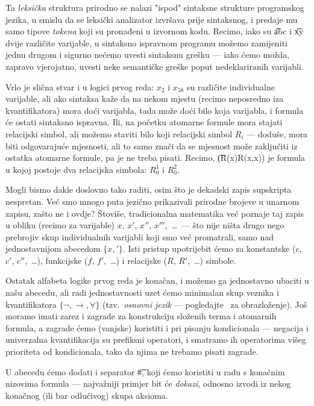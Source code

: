 Ta \emph{leksička} struktura prirodno se nalazi "ispod" sintaksne strukture programskog jezika, u smislu da se leksički analizator izvršava prije sintaksnog, i predaje mu samo tipove \emph{tokena} koji su pronađeni u izvornom kodu. Recimo, iako su \t{abc} i \t{xy} dvije različite varijable, u sintaksno ispravnom programu možemo zamijeniti jednu drugom i sigurno nećemo uvesti sintaksnu grešku --- iako ćemo možda, zapravo vjerojatno, uvesti neke semantičke greške poput nedeklariranih varijabli.

Vrlo je slična stvar i u logici prvog reda: $x_2$ i $x_{58}$ su različite individualne varijable, ali ako sintaksa kaže da na nekom mjestu (recimo neposredno iza kvantifikatora) mora doći varijabla, tada može doći bilo koja varijabla, i formula će ostati sintaksno ispravna. Ili, na početku atomarne formule mora stajati relacijski simbol, ali možemo staviti bilo koji relacijski simbol $R_i$ --- doduše, mora biti odgovarajuće mjesnosti, ali to samo znači da se mjesnost može zaključiti iz ostatka atomarne formule, pa je ne treba pisati. Recimo, \t{(R(x)\textrightarrow R(x,x))} je formula u kojoj postoje dva relacijska simbola: $R_0^1$ i $R_0^2$.

Mogli bismo dakle doslovno tako raditi, osim što je dekadski zapis supskripta nespretan. Već smo mnogo puta jezično prikazivali prirodne brojeve u unarnom zapisu, zašto ne i ovdje? Štoviše, tradicionalna matematika već poznaje taj zapis u obliku (recimo za varijable) $x$, $x'$, $x''$, $x'''$,~\ldots\ --- što nije ništa drugo nego prebrojiv skup individualnih varijabli koji smo već promatrali, samo nad jednostavnijom abecedom $\{x,'\!\}$. Isti pristup upotrijebit ćemo za konstantske ($c$, $c'$, $c''$,~\ldots), funkcijske ($f$, $f'$,~\ldots) i relacijske ($R$, $R'$,~\ldots) simbole.

Ostatak alfabeta logike prvog reda je konačan, i možemo ga jednostavno ubaciti u našu abecedu, ali radi jednostavnosti uzet ćemo minimalan skup veznika i kvantifikatora $\{\lnot,\to,\forall\}$ (tzv.\ \emph{osnovni jezik} --- pogledajte~\cite{skr:VukML} za obrazloženje). Još moramo imati zarez i zagrade za konstrukciju složenih terma i atomarnih formula, a zagrade ćemo (vanjske) koristiti i pri pisanju kondicionala --- negacija i univerzalna kvantifikacija su prefiksni operatori, i smatramo ih operatorima višeg prioriteta od kondicionala, tako da njima ne trebamo pisati zagrade.

U abecedu ćemo dodati i separator \t\#, koji ćemo koristiti u radu s konačnim nizovima formula --- najvažniji primjer bit će \emph{dokazi}, odnosno izvodi iz nekog konačnog (ili bar odlučivog) skupa aksioma.

